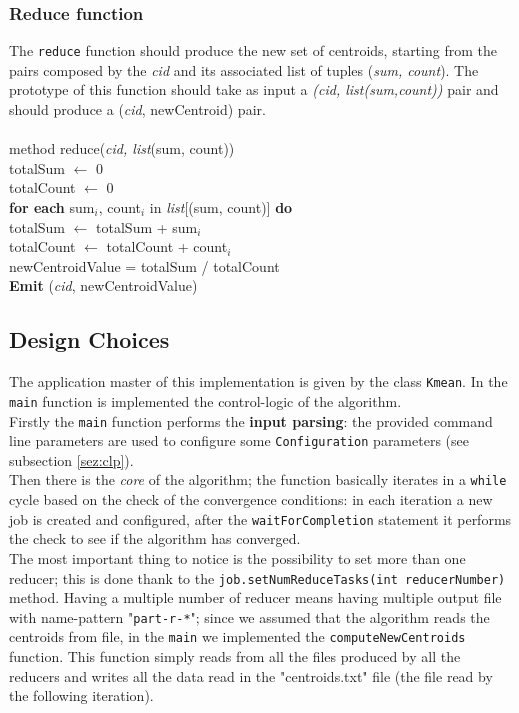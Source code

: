 \documentclass[11pt,a4paper]{article}
\begin{document}
\subsubsection{Reduce function}\label{sez:reduce}
The \texttt{reduce} function should produce the new set of centroids, starting from the pairs composed by the \textit{cid} and its associated list of tuples (\textit{sum, count}). The prototype of this function should take as input a \textit{(cid, list(sum,count))} pair and should produce a (\textit{cid}, newCentroid) pair.\\\\
\noindent method reduce(\textit{cid, list}(sum, count))\\
\indent totalSum $\leftarrow$ 0\\
\indent totalCount $\leftarrow$ 0\\
\indent \textbf{for each} sum$_i$, count$_i$ in \textit{list}[(sum, count)] \textbf{do}\\
\indent\indent totalSum $\leftarrow$ totalSum + sum$_i$\\
\indent\indent totalCount $\leftarrow$ totalCount + count$_i$\\
\indent newCentroidValue = totalSum / totalCount\\
\indent \textbf{Emit} (\textit{cid}, newCentroidValue)
\subsection{Design Choices}
The application master of this implementation is given by the class \texttt{Kmean}. In the \texttt{main} function is implemented the control-logic of the algorithm.\\
Firstly the \texttt{main} function performs the \textbf{input parsing}: the provided command line parameters are used to configure some \texttt{Configuration} parameters (see subsection \ref{sez:clp}).\\
Then there is the \textit{core} of the algorithm; the function basically iterates in a \texttt{while} cycle based on the check of the convergence conditions: in each iteration a new job is created and configured, after the \texttt{waitForCompletion} statement it performs the check to see if the algorithm has converged.\\
The most important thing to notice is the possibility to set more than one reducer; this is done thank to the \texttt{job.setNumReduceTasks(int reducerNumber)} method. Having a multiple number of reducer means having multiple output file with name-pattern "\texttt{part-r-*}"; since we assumed that the algorithm reads the centroids from file, in the \texttt{main} we implemented the \texttt{computeNewCentroids} function. This function simply reads from all the files produced by all the reducers and writes all the data read in the "centroids.txt" file (the file read by the following iteration).
\end{document}
